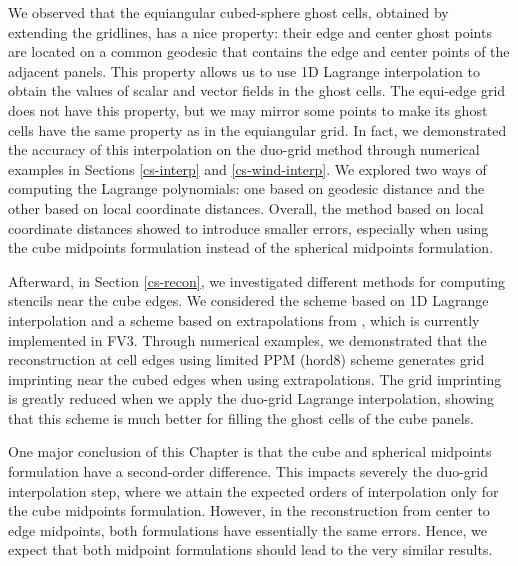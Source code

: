 We observed that the equiangular cubed-sphere ghost cells, obtained by extending the gridlines, has a nice property:
their edge and center ghost points are located on a common geodesic that contains the edge and center points of the adjacent panels. 
This property allows us to use 1D Lagrange interpolation to obtain the values of scalar and vector fields in the ghost cells.
The equi-edge grid does not have this property, but we may mirror some points to make its ghost cells have the same property as in the equiangular grid.
In fact, we demonstrated the accuracy of this interpolation on the duo-grid method through numerical examples in Sections \ref{cs-interp} and \ref{cs-wind-interp}.
We explored two ways of computing the Lagrange polynomials: one based on geodesic distance and the other based on local coordinate distances.
Overall, the method based on local coordinate distances showed to introduce smaller errors,
especially when using the cube midpoints formulation instead of the spherical midpoints formulation.

Afterward, in Section \ref{cs-recon}, we investigated different methods for computing stencils near the cube edges.
We considered the scheme based on 1D Lagrange interpolation and a scheme based on extrapolations from \citet{putman:2007}, which is currently implemented in FV3.
Through numerical examples, we demonstrated that the reconstruction at cell edges using  limited PPM (hord8) scheme generates grid imprinting near
the cubed edges when using extrapolations.
The grid imprinting is greatly reduced when we apply the duo-grid Lagrange interpolation,
showing that this scheme is much better for filling the ghost cells of the cube panels.

One major conclusion of this Chapter is that the cube and spherical midpoints formulation have a second-order difference.
This impacts severely the duo-grid interpolation step, where we attain the expected orders of interpolation only for the cube midpoints formulation.
However, in the reconstruction from center to edge midpoints, both formulations have essentially the same errors.
Hence, we expect that both midpoint formulations should lead to the very similar results.


